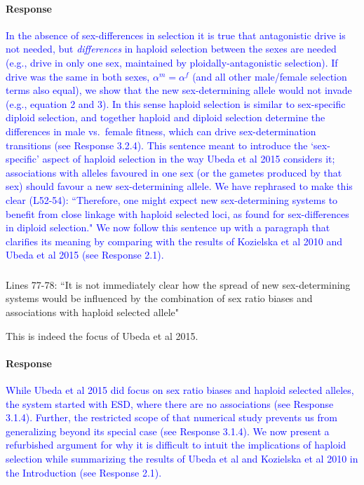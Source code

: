 \documentclass[10pt,letterpaper]{article}
\begin{document}
\noindent\paragraph{Response}
\textcolor{blue}{In the absence of sex-differences in selection it is true that antagonistic drive is not needed, but \textit{differences} in haploid selection between the sexes are needed (e.g., drive in only one sex, maintained by ploidally-antagonistic selection). 
If drive was the same in both sexes, $\alpha^{m}=\alpha^{f}$ (and all other male/female selection terms also equal), we show that the new sex-determining allele would not invade (e.g., equation 2 and 3). 
In this sense haploid selection is similar to sex-specific diploid selection, and together haploid and diploid selection determine the differences in male vs.\ female fitness, which can drive sex-determination transitions (see Response 3.2.4).
This sentence meant to introduce the `sex-specific' aspect of haploid selection in the way Ubeda et al 2015 considers it; associations with alleles favoured in one sex (or the gametes produced by that sex) should favour a new sex-determining allele.
We have rephrased to make this clear (L52-54): ``Therefore, one might expect new sex-determining systems to benefit from close linkage with haploid selected loci, as found for sex-differences in diploid selection."
We now follow this sentence up with a paragraph that clarifies its meaning by comparing with the results of Kozielska et al 2010 and Ubeda et al 2015 (see Response 2.1).}

\noindent\subsubsection{}
Lines 77-78: ``It is not immediately clear how the spread of new sex-determining systems would be influenced by the combination of sex ratio biases and associations with haploid selected allele"

This is indeed the focus of Ubeda et al 2015.

\noindent\paragraph{Response}
\textcolor{blue}{While Ubeda et al 2015 did focus on sex ratio biases and haploid selected alleles, the system started with ESD, where there are no associations (see Response 3.1.4).
Further, the restricted scope of that numerical study prevents us from generalizing beyond its special case (see Response 3.1.4).
We now present a refurbished argument for why it is difficult to intuit the implications of haploid selection while summarizing the results of Ubeda et al and Kozielska et al 2010 in the Introduction (see Response 2.1).
}
\end{document}
